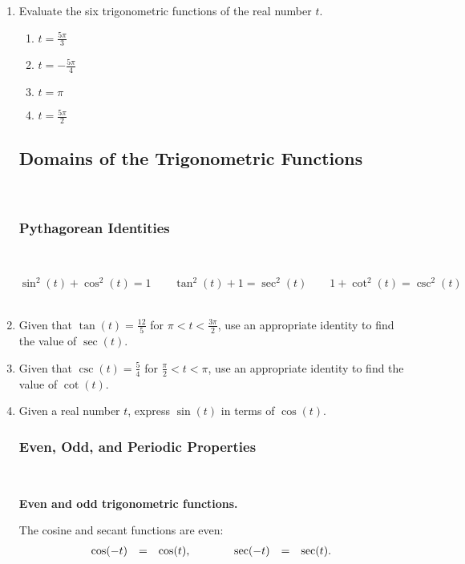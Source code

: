 \begin{enumerate}
\item Evaluate the six trigonometric functions of the real number $t$.
\begin{enumerate}
\item $\displaystyle t=\frac{5\pi}{3}$
\newpage
\item $\displaystyle t=-\frac{5\pi}{4}$\vfill
\item $\displaystyle t=\pi$\vfill
\item $\displaystyle t=\frac{5\pi}{2}$\vfill
\end{enumerate}


\newpage

\subsection{Domains of the Trigonometric Functions} ~


\subsubsection{Pythagorean Identities} ~

$$\sin^2(t)+\cos^2(t)=1 \quad \quad \tan^2(t)+1=\sec^2(t) \quad \quad 1+\cot^2(t)=\csc^2(t)$$
\\

\item Given that $\tan(t)=\frac{12}{5}$ for $\pi < t < \frac{3\pi}{2}$, use an appropriate identity to find the value of $\sec(t)$.\\[2in]

\item Given that $\csc(t)=\frac{5}{4}$ for $\frac{\pi}{2} < t < \pi$, use an appropriate identity to find the value of $\cot(t)$.\\[2in]

\item Given a real number $t$, express $\sin(t)$ in terms of $\cos(t)$.\\[1.5in]

\newpage

\subsubsection{Even, Odd, and Periodic Properties} ~

   \noindent\colorbox{blue!10}{%
   \parbox{\dimexpr\linewidth}%
   {%
     \textbf{Even and odd trigonometric functions.}

     The cosine and secant functions are even:
     \begin{eqnarray*}
       \begin{array}{rcl@{\hspace{4em}}rcl}
         \cos(-t) & = & \cos(t), & \sec(-t) & = & \sec(t).
       \end{array}
     \end{eqnarray*}

}}
\end{enumerate}

